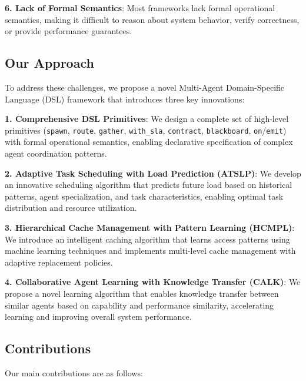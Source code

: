\documentclass[conference]{IEEEtran}
\begin{document}
\textbf{6. Lack of Formal Semantics}: Most frameworks lack formal operational semantics, making it difficult to reason about system behavior, verify correctness, or provide performance guarantees.

\subsection{Our Approach}

To address these challenges, we propose a novel Multi-Agent Domain-Specific Language (DSL) framework that introduces three key innovations:

\textbf{1. Comprehensive DSL Primitives}: We design a complete set of high-level primitives (\texttt{spawn}, \texttt{route}, \texttt{gather}, \texttt{with\_sla}, \texttt{contract}, \texttt{blackboard}, \texttt{on}/\texttt{emit}) with formal operational semantics, enabling declarative specification of complex agent coordination patterns.

\textbf{2. Adaptive Task Scheduling with Load Prediction (ATSLP)}: We develop an innovative scheduling algorithm that predicts future load based on historical patterns, agent specialization, and task characteristics, enabling optimal task distribution and resource utilization.

\textbf{3. Hierarchical Cache Management with Pattern Learning (HCMPL)}: We introduce an intelligent caching algorithm that learns access patterns using machine learning techniques and implements multi-level cache management with adaptive replacement policies.

\textbf{4. Collaborative Agent Learning with Knowledge Transfer (CALK)}: We propose a novel learning algorithm that enables knowledge transfer between similar agents based on capability and performance similarity, accelerating learning and improving overall system performance.

\subsection{Contributions}

Our main contributions are as follows:
\end{document}
